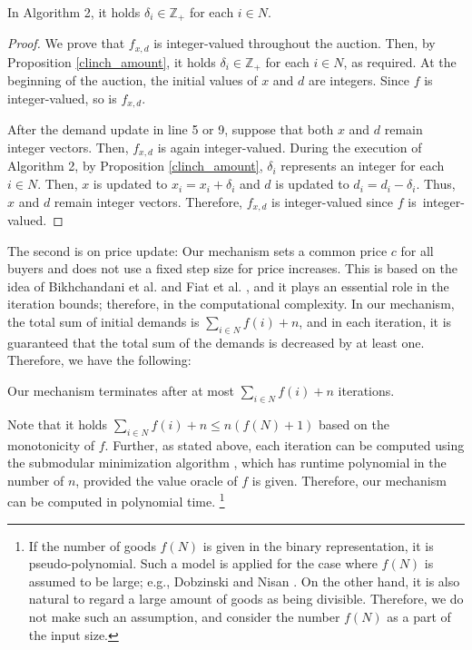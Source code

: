 \documentclass[letterpaper,11pt]{article}
\begin{document}
\begin{proposition}
\label{integer-clinching}
In Algorithm 2, it holds $\delta_i\in \mathbb Z_+$ for each $i\in N$.
\end{proposition}
\begin{proof}
We prove that $f_{x,d}$ is integer-valued throughout the auction.
Then, by Proposition \ref{clinch_amount}, it holds $\delta_i\in \mathbb Z_+$ for each $i\in N$, as required.
At the beginning of the auction, the initial values of $x$ and $d$ are integers.
Since $f$ is integer-valued, so is $f_{x,d}$.

After the demand update in line 5 or 9, suppose that both $x$ and $d$ remain integer vectors. 
Then, $f_{x,d}$ is again integer-valued.
During the execution of Algorithm 2, by Proposition \ref{clinch_amount}, 
$\delta_i$ represents an integer for each $i\in N$.
Then, $x$ is updated to $x_i=x_i+\delta_i$ and $d$ is updated to $d_i=d_i-\delta_i$.
Thus, $x$ and $d$ remain integer vectors. 
Therefore, $f_{x,d}$ is integer-valued since $f$ is~integer-valued.
\end{proof}



The second is on price update: 
Our mechanism sets a common price $c$ for all buyers and does not use a fixed step size for price increases.
This is based on the idea of Bikhchandani et al. \cite{BSV2011} and Fiat et al. \cite{FLSS2011}, 
and it plays an essential role 
in the iteration bounds; therefore, in the computational complexity.
In our mechanism, the total sum of initial demands is $\sum_{i\in N} f(i)+n$, 
and in each iteration, it is guaranteed that the total sum of the demands is decreased by at least one.
Therefore, we have the following: 

\begin{observation}
Our mechanism terminates after at most $\sum_{i\in N} f(i)+n$ iterations.
\end{observation}

Note that it holds $\sum_{i\in N} f(i)+n\leq n(f(N)+1)$
based on the monotonicity of $f$.
Further, as stated above, 
each iteration can be computed using the submodular minimization algorithm \cite{LSW2015},
which has runtime polynomial in the number of $n$, provided the value oracle of $f$ is given.
Therefore, our mechanism can be computed in polynomial time.
\footnote{If the number of goods $f(N)$ is given in the binary representation, it is pseudo-polynomial. Such a model is applied for the case where $f(N)$ is assumed to be large; e.g., Dobzinski and Nisan \cite{DN2010}. On the other hand, it is also natural to regard a large amount of goods as being divisible. Therefore, we do not make such an assumption, and consider the number $f(N)$ as a part of the input size.} 
\end{document}
